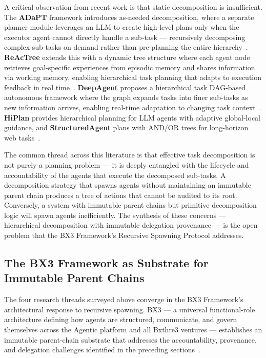 A critical observation from recent work is that static decomposition is insufficient. The \textbf{ADaPT} framework introduces as-needed decomposition, where a separate planner module leverages an LLM to create high-level plans only when the executor agent cannot directly handle a sub-task — recursively decomposing complex sub-tasks on demand rather than pre-planning the entire hierarchy~\cite{recap2025}. \textbf{ReAcTree} extends this with a dynamic tree structure where each agent node retrieves goal-specific experiences from episodic memory and shares information via working memory, enabling hierarchical task planning that adapts to execution feedback in real time~\cite{reactree2025}. \textbf{DeepAgent} proposes a hierarchical task DAG-based autonomous framework where the graph expands tasks into finer sub-tasks as new information arrives, enabling real-time adaptation to changing task context~\cite{deepagent2025}. \textbf{HiPlan} provides hierarchical planning for LLM agents with adaptive global-local guidance, and \textbf{StructuredAgent} plans with AND/OR trees for long-horizon web tasks~\cite{hiplan2025,structuredagent2025}.

The common thread across this literature is that effective task decomposition is not purely a planning problem — it is deeply entangled with the lifecycle and accountability of the agents that execute the decomposed sub-tasks. A decomposition strategy that spawns agents without maintaining an immutable parent chain produces a tree of actions that cannot be audited to its root. Conversely, a system with immutable parent chains but primitive decomposition logic will spawn agents inefficiently. The synthesis of these concerns — hierarchical decomposition with immutable delegation provenance — is the open problem that the BX3 Framework's Recursive Spawning Protocol addresses.

\subsection{The BX3 Framework as Substrate for Immutable Parent Chains}
\label{sec:bx3}

The four research threads surveyed above converge in the BX3 Framework's architectural response to recursive spawning. BX3 — a universal functional-role architecture defining how agents are structured, communicate, and govern themselves across the Agentic platform and all Bxthre3 ventures — establishes an immutable parent-chain substrate that addresses the accountability, provenance, and delegation challenges identified in the preceding sections~\cite{bx3framework,bx3framework2026}.

